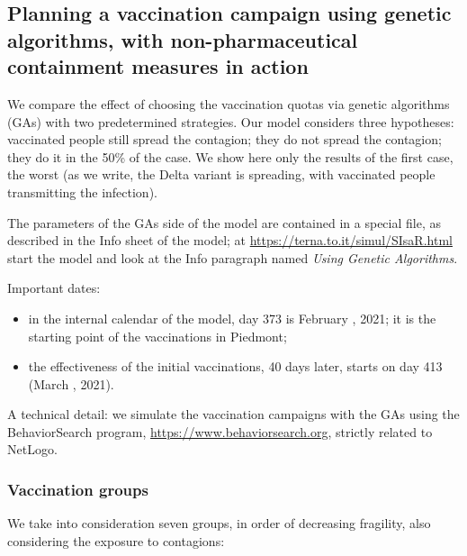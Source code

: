 \documentclass[graybox]{svmult}
\begin{document}
\subsection{Planning a vaccination campaign using genetic algorithms, with non-pharmaceutical containment measures in action}
\label{planGA}

We compare the effect of choosing the vaccination quotas via genetic algorithms (GAs) with two predetermined strategies. Our model considers three hypotheses: vaccinated people still spread the contagion; they do not spread the contagion; they do it in the 50\% of the case. We show here only the results of the first case, the worst (as we write, the Delta variant is spreading, with vaccinated people transmitting the infection). 

The parameters of the GAs side of the model are contained in a special file, as described in the Info sheet of the model; at  \href{https://terna.to.it/simul/SIsaR.html}{https://terna.to.it/simul/SIsaR.html} start the model and look at the Info paragraph named \emph{Using Genetic Algorithms}.

Important dates: 
\begin{itemize}
\item in the internal calendar of the model, day 373 is February , 2021; it is the starting point of the vaccinations in Piedmont; 

\item the effectiveness of the initial vaccinations, 40 days later, starts on day 413 (March , 2021).
\end{itemize}

A technical detail: we simulate the vaccination campaigns with the GAs using the BehaviorSearch program, \href{https://www.behaviorsearch.org}{https://www.behaviorsearch.org}, strictly related to NetLogo.

\subsubsection{Vaccination groups}
\label{vgroups}

We take into consideration seven groups, in order of decreasing fragility, also considering the exposure to contagions:
\end{document}
